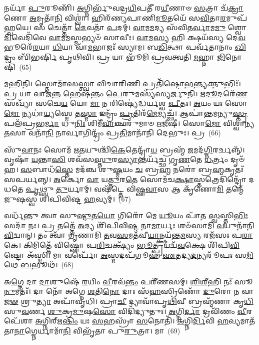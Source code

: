𑌨𑌰𑍍𑌯𑌾᳴ \ul{𑌪𑍁}\-𑌰𑍂𑌣𑌿᳴। \ul{𑌅}\-𑌗𑍍𑌨𑌿𑌰𑍍𑌭𑍁᳴𑌵𑌦𑍍𑌰\-\ul{𑌯𑌿}\-𑌪𑌤𑍀᳴ 𑌰\-\ul{𑌯𑍀}\-𑌣𑌾𑍞 \ul{𑌸}\-𑌤𑍍𑌰𑌾 𑌚᳴\-\ul{𑌕𑍍𑌰𑌾}\-𑌣𑍋 \ul{𑌅}\-𑌮𑍃𑌤𑌾᳴\-\ul{𑌨𑌿} 𑌵𑌿𑌶𑍍𑌵𑌾॑। 𑌹𑌿𑌰᳴𑌣𑍍𑌯𑌪𑌾𑌣𑌿\-\ul{𑌮𑍂}\-𑌤𑌯𑍇᳴ 𑌸\-\ul{𑌵𑌿}\-𑌤𑌾\-\ul{𑌰}\-𑌮𑍁𑌪᳴ 𑌹𑍍𑌵𑌯𑍇। 𑌸 𑌚𑍇𑌤𑍍𑌤𑌾᳴ \ul{𑌦𑍇}\-𑌵𑌤𑌾᳴ \ul{𑌪}\-𑌦𑌮𑍍। \ul{𑌵𑌾}\-𑌮\-\ul{𑌮}\-𑌦𑍍𑌯 𑌸᳴𑌵𑌿𑌤\-\ul{𑌰𑍍𑌵𑌾}\-𑌮\-\ul{𑌮𑍁} 𑌶𑍍𑌵𑍋 \ul{𑌦𑌿}\-𑌵𑍇𑌦𑌿᳴𑌵𑍇 \ul{𑌵𑌾}\-𑌮\-\ul{𑌮}\-𑌸𑍍𑌮𑌭𑍍𑌯𑍞᳴ 𑌸𑌾𑌵𑍀𑌃। \ul{𑌵𑌾}\-𑌮\-\ul{𑌸𑍍𑌯} 𑌹𑌿 𑌕𑍍𑌷𑌯᳴𑌸𑍍𑌯 𑌦𑍇\-\ul{𑌵} 𑌭𑍂𑌰𑍇᳴\-\ul{𑌰}\-𑌯𑌾 \ul{𑌧𑌿}\-𑌯𑌾 𑌵𑌾᳴\-\ul{𑌮}\-𑌭𑌾𑌜𑌃᳴ 𑌸𑍍𑌯𑌾𑌮। 𑌬\-\ul{𑌡𑌿}\-𑌤𑍍𑌥𑌾 𑌪𑌰𑍍𑌵᳴𑌤𑌾𑌨𑌾𑌂 \ul{𑌖𑌿}\-𑌦𑍍𑌰𑌂 𑌬𑌿᳴𑌭𑌰𑍍\mbox{}𑌷𑌿 𑌪𑍃𑌥𑌿𑌵𑌿। 𑌪𑍍𑌰 𑌯𑌾 𑌭𑍂᳴𑌮𑌿 𑌪𑍍𑌰𑌵𑌤𑍍𑌵𑌤𑌿 \ul{𑌮}\-𑌹𑍍𑌨𑌾 \ul{𑌜𑌿}\-𑌨𑍋𑌷𑌿᳴~(65)

𑌮𑌹𑌿𑌨𑌿। 𑌸𑍍𑌤𑍋𑌮𑌾᳴𑌸𑌸𑍍𑌤𑍍𑌵𑌾 𑌵𑌿𑌚𑌾𑌰𑌿\-\ul{𑌣𑌿} 𑌪𑍍𑌰𑌤𑌿᳴𑌷𑍍𑌟𑍋𑌭\-\ul{𑌨𑍍𑌤𑍍𑌯}\-𑌕𑍍𑌤𑍁𑌭𑌿𑌃᳴। 𑌪𑍍𑌰 𑌯𑌾 𑌵𑌾\-\ul{𑌜}\-𑌨𑍍𑌨 𑌹𑍇𑌷᳴𑌨𑍍𑌤𑌂 \ul{𑌪𑍇}\-𑌰𑍁𑌮𑌸𑍍𑌯᳴𑌸𑍍𑌯𑌰𑍍𑌜𑍁𑌨𑌿। \ul{𑌋}\-\-\ul{𑌦𑍂}\-𑌦𑌰𑍇᳴\-\ul{𑌣} 𑌸𑌖𑍍𑌯𑌾᳴ 𑌸𑌚𑍇\-\ul{𑌯} 𑌯𑍋 \ul{𑌮𑌾} 𑌨 𑌰𑌿𑌷𑍍𑌯𑍇॑𑌦𑍍𑌧𑌰𑍍𑌯𑌶𑍍𑌵 \ul{𑌪𑍀}\-𑌤𑌃। \ul{𑌅}\-𑌯𑌂 𑌯𑌃 𑌸𑍋\-\ul{𑌮𑍋} 𑌨𑍍𑌯𑌧𑌾॑\-\ul{𑌯𑍍𑌯}\-𑌸𑍍𑌮𑍇 𑌤\-\ul{𑌸𑍍𑌮𑌾} 𑌇𑌨𑍍𑌦𑍍𑌰𑌂᳴ \ul{𑌪𑍍𑌰}\-𑌤𑌿𑌰᳴\-\ul{𑌮𑍇}\-𑌮𑍍𑌯𑌚𑍍𑌛᳴। 𑌆𑌪𑌾॑𑌨𑍍𑌤𑌮𑌨𑍍𑌯𑍁\-\ul{𑌸𑍍𑌤𑍃}\-𑌪𑌲᳴𑌪𑍍𑌰𑌭\-\ul{𑌰𑍍𑌮𑌾} 𑌧𑍁\-\ul{𑌨𑌿𑌃} 𑌶𑌿𑌮𑍀᳴\-\ul{𑌵𑌾}\-𑌞𑍍𑌛𑌰𑍁᳴𑌮𑌾𑍞 𑌋\-\ul{𑌜𑍀}\-𑌷𑍀। 𑌸𑍋\-\ul{𑌮𑍋} 𑌵𑌿𑌶𑍍𑌵𑌾॑𑌨𑍍𑌯\-\ul{𑌤}\-𑌸𑌾 𑌵𑌨𑌾᳴\-\ul{𑌨𑌿} 𑌨𑌾𑌰𑍍𑌵𑌾𑌗𑌿𑌨𑍍𑌦𑍍𑌰𑌂᳴ 𑌪𑍍𑌰\-\ul{𑌤𑌿}\-𑌮𑌾𑌨𑌾᳴𑌨𑌿 𑌦𑍇𑌭𑍁𑌃। 𑌪𑍍𑌰~(66)

𑌸𑍁᳴\-\ul{𑌵𑌾}\-𑌨𑌃 𑌸𑍋𑌮᳴ 𑌋\-\ul{𑌤}\-𑌯𑍁𑌶𑍍𑌚𑌿᳴\-\ul{𑌕𑍇}\-𑌤𑍇𑌨𑍍𑌦𑍍𑌰𑌾᳴\-\ul{𑌯} 𑌬𑍍𑌰𑌹𑍍𑌮᳴ \ul{𑌜}\-𑌮𑌦᳴\-\ul{𑌗𑍍𑌨𑌿}\-𑌰𑌰𑍍𑌚𑌨𑍍𑌨𑍍᳴। 𑌵𑍃𑌷𑌾᳴ \ul{𑌯}\-𑌨𑍍𑌤𑌾\-\ul{𑌸𑌿} 𑌶𑌵᳴𑌸\-\ul{𑌸𑍍𑌤𑍁}\-𑌰\-\ul{𑌸𑍍𑌯𑌾}\-𑌨𑍍𑌤𑌰𑍍𑌯᳴𑌚𑍍𑌛 𑌗𑍃\-\ul{𑌣}\-𑌤𑍇 \ul{𑌧}\-𑌰𑍍𑌤𑍍𑌰𑌂 𑌦𑍃𑍞᳴𑌹। \ul{𑌸}\-𑌬𑌾𑌧᳴\-\ul{𑌸𑍍𑌤𑍇} 𑌮𑌦᳴𑌞𑍍𑌚 𑌶𑍁\-\ul{𑌷𑍍𑌮}\-𑌯𑌂 \ul{𑌚} 𑌬𑍍𑌰\-\ul{𑌹𑍍𑌮} 𑌨𑌰𑍋॑ 𑌬𑍍𑌰\-\ul{𑌹𑍍𑌮}\-𑌕𑍃𑌤𑌃᳴ 𑌸𑌪𑌰𑍍𑌯𑌨𑍍𑌨𑍍। \ul{𑌅}\-𑌰𑍍𑌕𑍋 \ul{𑌵𑌾} 𑌯\-\ul{𑌤𑍍𑌤𑍁}\-𑌰\-\ul{𑌤𑍇} 𑌸𑍋𑌮᳴𑌚\-\ul{𑌕𑍍𑌷𑌾}\-𑌸𑍍𑌤𑌤𑍍𑌰𑍇𑌦𑌿𑌨𑍍𑌦𑍍𑌰𑍋᳴ 𑌦𑌧𑌤𑍇 \ul{𑌪𑍃}\-𑌥𑍍𑌸𑍁 \ul{𑌤𑍁}\-𑌰𑍍𑌯𑌾𑌮𑍍। 𑌵𑌷᳴𑌟𑍍𑌤𑍇 𑌵𑌿𑌷𑍍𑌣\-\ul{𑌵𑌾}\-𑌸 𑌆 𑌕𑍃᳴𑌣𑍋\-\ul{𑌮𑌿} 𑌤𑌨𑍍𑌮𑍇᳴ 𑌜𑍁𑌷𑌸𑍍𑌵 𑌶𑌿𑌪𑌿𑌵𑌿𑌷𑍍𑌟 \ul{𑌹}\-𑌵𑍍𑌯𑌮𑍍।~(67)

𑌵𑌰𑍍𑌧᳴𑌨𑍍𑌤𑍁 𑌤𑍍𑌵𑌾 𑌸𑍁\-\ul{𑌷𑍍𑌟𑍁}\-𑌤\-\ul{𑌯𑍋} 𑌗𑌿𑌰𑍋᳴ 𑌮𑍇 \ul{𑌯𑍂}\-𑌯𑌂 𑌪𑌾᳴𑌤 \ul{𑌸𑍍𑌵}\-𑌸𑍍𑌤𑌿\-\ul{𑌭𑌿𑌃} 𑌸𑌦𑌾᳴ 𑌨𑌃। 𑌪𑍍𑌰 𑌤𑌤𑍍𑌤𑍇᳴ \ul{𑌅}\-𑌦𑍍𑌯 𑌶𑌿᳴𑌪𑌿𑌵𑌿\-\ul{𑌷𑍍𑌟} 𑌨𑌾\-\ul{𑌮𑌾}\-𑌰𑍍𑌯𑌃 𑌶𑍞᳴𑌸𑌾𑌮𑌿 \ul{𑌵}\-𑌯𑍁𑌨𑌾᳴𑌨𑌿 \ul{𑌵𑌿}\-𑌦𑍍𑌵𑌾𑌨𑍍। 𑌤𑌂 𑌤𑍍𑌵𑌾᳴ 𑌗𑍃𑌣𑌾𑌮𑌿 \ul{𑌤}\-𑌵\-\ul{𑌸}\-𑌮𑌤᳴𑌵𑍀\-\ul{𑌯𑌾}\-𑌨𑍍𑌕𑍍𑌷𑌯᳴𑌨𑍍𑌤\-\ul{𑌮}\-𑌸𑍍𑌯 𑌰𑌜᳴𑌸𑌃 𑌪\-\ul{𑌰𑌾}\-𑌕𑍇। 𑌕𑌿𑌮𑌿𑌤𑍍𑌤𑍇᳴ 𑌵𑌿𑌷𑍍𑌣𑍋 𑌪\-\ul{𑌰𑌿}\-𑌚𑌕𑍍𑌷𑍍𑌯𑌂᳴ \ul{𑌭𑍂}\-𑌤𑍍𑌪𑍍𑌰𑌯𑌦𑍍𑌵᳴\-\ul{𑌵}\-𑌕𑍍𑌷𑍇 𑌶𑌿᳴𑌪𑌿\-\ul{𑌵𑌿}\-𑌷𑍍𑌟𑍋 𑌅᳴𑌸𑍍𑌮𑌿। 𑌮𑌾 𑌵𑌰𑍍𑌪𑍋᳴ \ul{𑌅}\-𑌸𑍍𑌮𑌦𑌪᳴𑌗𑍂𑌹 \ul{𑌏}\-𑌤𑌦𑍍𑌯\-\ul{𑌦}\-𑌨𑍍𑌯𑌰𑍂᳴𑌪𑌃 𑌸\-\ul{𑌮𑌿}\-𑌥𑍇 \ul{𑌬}\-𑌭𑍂𑌥᳴।~(68)

𑌅\-\ul{𑌗𑍍𑌨𑍇} 𑌦𑌾 \ul{𑌦𑌾}\-𑌶𑍁𑌷𑍇᳴ \ul{𑌰}\-𑌯𑌿𑌂 \ul{𑌵𑍀}\-𑌰𑌵᳴\-\ul{𑌨𑍍𑌤𑌂} 𑌪𑌰𑍀᳴𑌣𑌸𑌮𑍍। \ul{𑌶𑌿}\-\-\ul{𑌶𑍀}\-𑌹𑌿 𑌨𑌃᳴ 𑌸𑍂\-\ul{𑌨𑍁}\-𑌮𑌤𑌃᳴। 𑌦𑌾 𑌨𑍋᳴ 𑌅𑌗𑍍𑌨𑍇 \ul{𑌶}\-𑌤𑌿\-\ul{𑌨𑍋} 𑌦𑌾𑌃 𑌸᳴\-\ul{𑌹}\-𑌸𑍍𑌰𑌿𑌣𑍋᳴ \ul{𑌦𑍁}\-𑌰𑍋 𑌨 𑌵𑌾\-\ul{𑌜}\-\-\ul{𑍟} 𑌶𑍍𑌰𑍁\-\ul{𑌤𑍍𑌯𑌾} 𑌅𑌪𑌾᳴𑌵𑍃𑌧𑌿। 𑌪𑍍𑌰𑌾\-\ul{𑌚𑍀} 𑌦𑍍𑌯𑌾𑌵𑌾᳴𑌪𑍃\-\ul{𑌥𑌿}\-𑌵𑍀 𑌬𑍍𑌰𑌹𑍍𑌮᳴𑌣𑌾 𑌕𑍃\-\ul{𑌧𑌿} 𑌸𑍁\-\ul{𑌵}\-𑌰𑍍𑌣 \ul{𑌶𑍁}\-𑌕𑍍𑌰\-\ul{𑌮𑍁}\-𑌷\-\ul{𑌸𑍋} 𑌵𑌿𑌦𑌿᳴𑌦𑍍𑌯𑍁𑌤𑍁𑌃। \ul{𑌅}\-𑌗𑍍𑌨𑌿\-\ul{𑌰𑍍𑌦𑌾} 𑌦𑍍𑌰𑌵𑌿᳴𑌣𑌂 \ul{𑌵𑍀}\-𑌰𑌪𑍇᳴𑌶𑌾 \ul{𑌅}\-𑌗𑍍𑌨𑌿𑌰𑍍\mbox{}𑌋\-\ul{𑌷𑌿𑌂} 𑌯𑌃 \ul{𑌸}\-𑌹𑌸𑍍𑌰𑌾᳴ \ul{𑌸}\-𑌨𑍋𑌤𑌿᳴। \ul{𑌅}\-𑌗𑍍𑌨𑌿\-\ul{𑌰𑍍𑌦𑌿}\-𑌵𑌿 \ul{𑌹}\-𑌵𑍍𑌯𑌮𑌾𑌤᳴𑌤𑌾\-\ul{𑌨𑌾}\-𑌗𑍍𑌨𑍇𑌰𑍍𑌧𑌾𑌮𑌾᳴\-\ul{𑌨𑌿} 𑌵𑌿𑌭𑍃᳴𑌤𑌾 𑌪𑍁\-\ul{𑌰𑍁}\-𑌤𑍍𑌰𑌾। 𑌮𑌾~(69)

